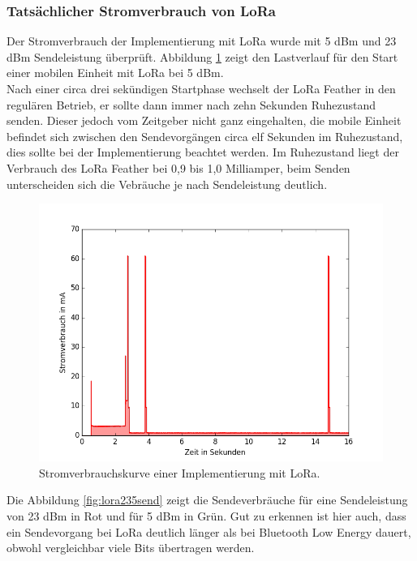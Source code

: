 \subsubsection{Tatsächlicher Stromverbrauch von LoRa}
\label{ch:phase3:sec:powerlora}
Der Stromverbrauch der Implementierung mit LoRa wurde mit 5 dBm und 23 dBm Sendeleistung überprüft.
Abbildung \ref{fig:lora5} zeigt den Lastverlauf für den Start einer mobilen Einheit mit LoRa bei 5 dBm.\\
Nach einer circa drei sekündigen Startphase wechselt der LoRa Feather in den regulären Betrieb, er sollte dann immer nach zehn Sekunden Ruhezustand senden.
Dieser jedoch vom Zeitgeber nicht ganz eingehalten, die mobile Einheit befindet sich zwischen den Sendevorgängen circa elf Sekunden im Ruhezustand, dies sollte bei der Implementierung beachtet werden.
Im Ruhezustand liegt der Verbrauch des LoRa Feather bei 0,9 bis 1,0 Milliamper, beim Senden unterscheiden sich die Vebräuche je nach Sendeleistung deutlich.\\

\begin{figure}[h!]
  \centering
	\includegraphics[width=\textwidth]{plots/lora5.png}
  \caption{Stromverbrauchskurve einer Implementierung mit LoRa.}
  \label{fig:lora5}
\end{figure}

Die Abbildung \ref{fig:lora235send} zeigt die Sendeverbräuche für eine Sendeleistung von 23 dBm in Rot und für 5 dBm in Grün.
Gut zu erkennen ist hier auch, dass ein Sendevorgang bei LoRa deutlich länger als bei Bluetooth Low Energy dauert, obwohl vergleichbar viele Bits übertragen werden.

